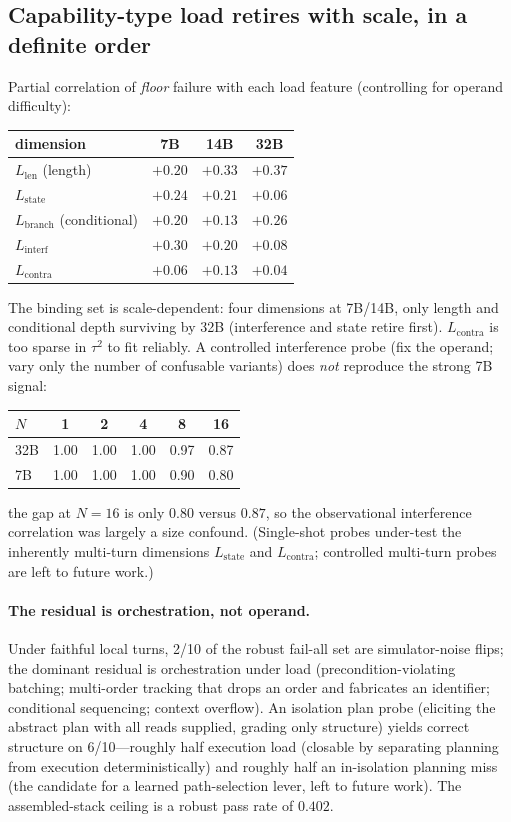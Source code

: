 \documentclass[10pt]{article}
\begin{document}
\subsection{Capability-type load retires with scale, in a definite order}\label{sec:load}
Partial correlation of \emph{floor} failure with each load feature (controlling for operand difficulty):
\begin{center}\small\begin{tabular}{lccc}
\toprule dimension & 7B & 14B & 32B \\ \midrule
$L_{\mathrm{len}}$ (length) & $+0.20$ & $+0.33$ & $\mathbf{+0.37}$ \\
$L_{\mathrm{state}}$ & $\mathbf{+0.24}$ & $\mathbf{+0.21}$ & $+0.06$ \\
$L_{\mathrm{branch}}$ (conditional) & $+0.20$ & $+0.13$ & $\mathbf{+0.26}$ \\
$L_{\mathrm{interf}}$ & $\mathbf{+0.30}$ & $\mathbf{+0.20}$ & $+0.08$ \\
$L_{\mathrm{contra}}$ & $+0.06$ & $+0.13$ & $+0.04$ \\ \bottomrule
\end{tabular}\end{center}
The binding set is scale-dependent: four dimensions at 7B/14B, only length and conditional depth surviving by 32B (interference and state retire first). $L_{\mathrm{contra}}$ is too sparse in $\tau^2$ to fit reliably. A controlled interference probe (fix the operand; vary only the number of confusable variants) does \emph{not} reproduce the strong 7B signal:
\begin{center}\small\begin{tabular}{lccccc}
\toprule $N$ & 1 & 2 & 4 & 8 & 16 \\ \midrule
32B & 1.00 & 1.00 & 1.00 & 0.97 & 0.87 \\
7B  & 1.00 & 1.00 & 1.00 & 0.90 & 0.80 \\ \bottomrule
\end{tabular}\end{center}
the gap at $N=16$ is only $0.80$ versus $0.87$, so the observational interference correlation was largely a size confound. (Single-shot probes under-test the inherently multi-turn dimensions $L_{\mathrm{state}}$ and $L_{\mathrm{contra}}$; controlled multi-turn probes are left to future work.)

\paragraph{The residual is orchestration, not operand.} Under faithful local turns, 2/10 of the robust fail-all set are simulator-noise flips; the dominant residual is orchestration under load (precondition-violating batching; multi-order tracking that drops an order and fabricates an identifier; conditional sequencing; context overflow). An isolation plan probe (eliciting the abstract plan with all reads supplied, grading only structure) yields correct structure on 6/10---roughly half execution load (closable by separating planning from execution deterministically) and roughly half an in-isolation planning miss (the candidate for a learned path-selection lever, left to future work). The assembled-stack ceiling is a robust pass rate of $0.402$.
\end{document}
